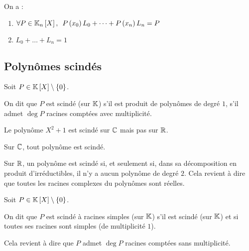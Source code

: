 \begin{corr}
On a :

\begin{enumerate}
\item \(\quantifs{\forall P\in\polydeg{n}}P\paren{x_0}L_0+\dots+P\paren{x_n}L_n=P\) \\

\item \(L_0+\dots+L_n=1\)
\end{enumerate}
\end{corr}

\subsection{Polynômes scindés}

\begin{defi}
Soit \(P\in\poly\excluant\accol{0}\).

On dit que \(P\) est scindé (sur \(\mathbb{K}\)) s'il est produit de polynômes de degré \(1\), \cad s'il admet \(\deg P\) racines comptées avec multiplicité.
\end{defi}

\begin{ex}
Le polynôme \(X^2+1\) est scindé sur \(\mathbb{C}\) mais pas sur \(\mathbb{R}\).
\end{ex}

\begin{prop}
Sur \(\mathbb{C}\), tout polynôme est scindé.

Sur \(\mathbb{R}\), un polynôme est scindé si, et seulement si, dans sa décomposition en produit d'irréductibles, il n'y a aucun polynôme de degré \(2\). Cela revient à dire que toutes les racines complexes du polynômes sont réelles.
\end{prop}

\begin{defi}
Soit \(P\in\poly\excluant\accol{0}\).

On dit que \(P\) est scindé à racines simples (sur \(\mathbb{K}\)) s'il est scindé (sur \(\mathbb{K}\)) et si toutes ses racines sont simples (\cad de multiplicité \(1\)).

Cela revient à dire que \(P\) admet \(\deg P\) racines comptées sans multiplicité.
\end{defi}

